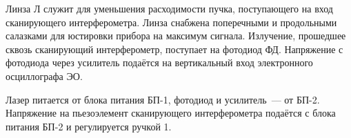 \documentclass[a4paper,12pt]{article} %
\begin{document}
Линза Л служит для уменьшения расходимости пучка, поступающего на вход сканирующего интерферометра. Линза снабжена поперечными и продольными салазками для юстировки прибора на максимум сигнала. Излучение, прошедшее сквозь сканирующий интерферометр, поступает на фотодиод ФД. Напряжение с фотодиода через усилитель подаётся на вертикальный вход электронного осциллографа ЭО.

Лазер питается от блока питания БП-1, фотодиод и усилитель~---
от БП-2. Напряжение на пьезоэлемент сканирующего интерферометра
подаётся с блока питания БП-2 и регулируется ручкой 1.


\end{document}
